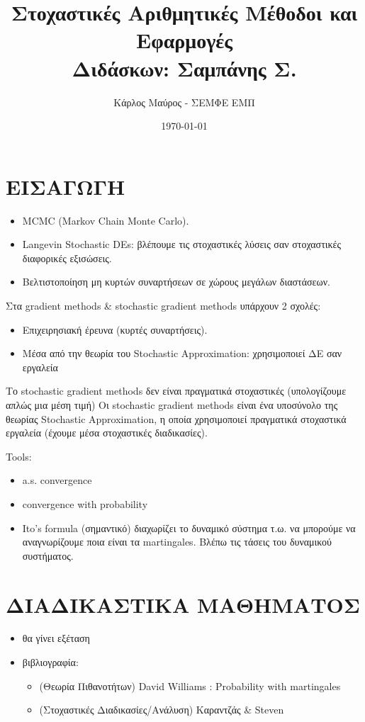\documentclass[12pt,a4paper]{article}
\author{Κάρλος Μαύρος - ΣΕΜΦΕ ΕΜΠ}
\date{\today}
\title{Στοχαστικές Αριθμητικές Μέθοδοι και Εφαρμογές\\\medskip
\large Διδάσκων: Σαμπάνης Σ.}
\theoremstyle{definition}
\numberwithin{equation}{section}
\begin{document}
\maketitle

\section{ΕΙΣΑΓΩΓΗ}
\label{sec:org8523e17}

\begin{itemize}
\item MCMC (Markov Chain Monte Carlo).
\item Langevin Stochastic DEs: βλέπουμε τις στοχαστικές λύσεις σαν στοχαστικές διαφορικές εξισώσεις.
\item Βελτιστοποίηση μη κυρτών συναρτήσεων σε χώρους μεγάλων διαστάσεων.
\end{itemize}



Στα gradient methods \& stochastic gradient methods υπάρχουν 2 σχολές:
\begin{itemize}
\item Επιχειρησιακή έρευνα (κυρτές συναρτήσεις).
\item Μέσα από την θεωρία του Stochastic Approximation: χρησιμοποιεί ΔΕ σαν εργαλεία
\end{itemize}

Το stochastic gradient methods δεν είναι πραγματικά στοχαστικές (υπολογίζουμε απλώς μια μέση τιμή)
Οι stochastic gradient methods είναι ένα υποσύνολο της θεωρίας Stochastic Approximation, η οποία
χρησιμοποιεί πραγματικά στοχαστικά εργαλεία (έχουμε μέσα στοχαστικές διαδικασίες).

Tools:
\begin{itemize}
\item a.s. convergence
\item convergence with probability
\item Ito's formula (σημαντικό) διαχωρίζει το δυναμικό σύστημα τ.ω. να μπορούμε να αναγνωρίζουμε ποια
είναι τα martingales. Βλέπω τις τάσεις του δυναμικού συστήματος.
\end{itemize}

\section{ΔΙΑΔΙΚΑΣΤΙΚΑ ΜΑΘΗΜΑΤΟΣ}
\label{sec:orgcadb6c2}
\begin{itemize}
\item θα γίνει εξέταση
\item βιβλιογραφία:
\begin{itemize}
\item (Θεωρία Πιθανοτήτων) David Williams : Probability with martingales
\item (Στοχαστικές Διαδικασίες/Ανάλυση) Καραντζάς \& Steven
\end{itemize}
\end{itemize}
\end{document}
